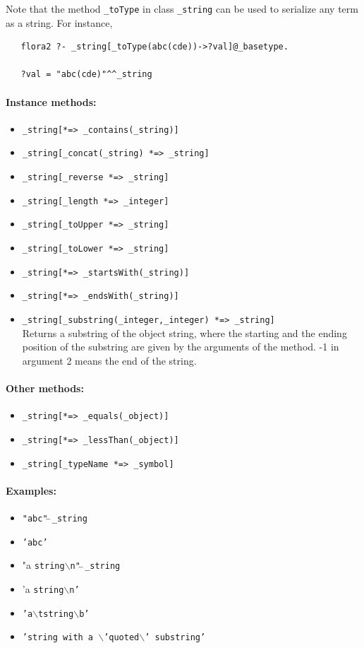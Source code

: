 \documentclass[11pt]{article}
\begin{document}
Note that the method {\tt \_toType} in class {\tt \_string} can be used to
serialize any term as a string. For instance,
\begin{verbatim}
   flora2 ?- _string[_toType(abc(cde))->?val]@_basetype.

   ?val = "abc(cde)"^^_string
\end{verbatim}

\paragraph{Instance  methods:}
\begin{itemize}
\item {\tt \_string[*=> \_contains(\_string)]}  
\item {\tt \_string[\_concat(\_string) *=> \_string]}  
\item {\tt \_string[\_reverse *=> \_string]}  
\item {\tt \_string[\_length *=> \_integer]}  
\item {\tt \_string[\_toUpper *=> \_string]}  
\item {\tt \_string[\_toLower *=> \_string]}  
\item {\tt \_string[*=> \_startsWith(\_string)]}  
\item {\tt \_string[*=> \_endsWith(\_string)]}  
\item {\tt \_string[\_substring(\_integer,\_integer) *=> \_string]}  
  \\
  Returns a substring of the object string, where the starting and the
  ending position of the substring are given by the arguments of the
  method. -1 in argument 2 means the end of the string.
\end{itemize}

\paragraph{Other methods:}
\begin{itemize}
\item {\tt \_string[*=> \_equals(\_object)]}  
\item {\tt \_string[*=> \_lessThan(\_object)]}  
\item {\tt \_string[\_typeName *=> \_symbol]}  
\end{itemize}

\paragraph{Examples:}
\begin{itemize}
\item {\tt "abc"$\hat{~}\hat{~}$\_string} 
\item {\tt 'abc'} 
\item "a {\tt string$\backslash$n"$\hat{~}\hat{~}$\_string} 
\item 'a {\tt string$\backslash$n'} 
\item {\tt 'a$\backslash$tstring$\backslash$b'} 
\item {\tt 'string with a $\backslash$'quoted$\backslash$' substring'}
\end{itemize}
\end{document}
